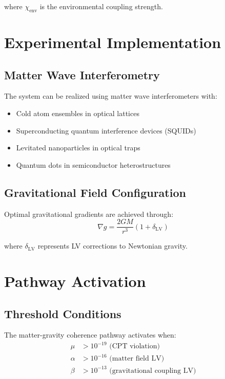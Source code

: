 \documentclass[11pt]{article}
\begin{document}
where $\chi_{\text{env}}$ is the environmental coupling strength.

\section{Experimental Implementation}

\subsection{Matter Wave Interferometry}

The system can be realized using matter wave interferometers with:
\begin{itemize}
\item Cold atom ensembles in optical lattices
\item Superconducting quantum interference devices (SQUIDs)
\item Levitated nanoparticles in optical traps
\item Quantum dots in semiconductor heterostructures
\end{itemize}

\subsection{Gravitational Field Configuration}

Optimal gravitational gradients are achieved through:
\begin{equation}
\nabla g = \frac{2GM}{r^3} \left(1 + \delta_{\text{LV}}\right)
\end{equation}

where $\delta_{\text{LV}}$ represents LV corrections to Newtonian gravity.

\section{Pathway Activation}

\subsection{Threshold Conditions}

The matter-gravity coherence pathway activates when:
\begin{align}
\mu &> 10^{-19} \text{ (CPT violation)} \\
\alpha &> 10^{-16} \text{ (matter field LV)} \\
\beta &> 10^{-13} \text{ (gravitational coupling LV)}
\end{align}
\end{document}
